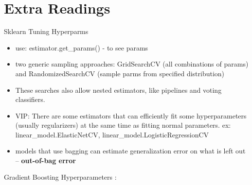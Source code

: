 \documentclass[a4paper]{report}
\newcommand{\brown}{\color{brown}}
\begin{document}
\section{Extra Readings}
Sklearn Tuning Hyperparms
\begin{itemize}
  \item use: {\brown estimator.get\_params()} - to see params
  \item two generic sampling approaches: GridSearchCV (all combinations of params) and RandomizedSearchCV (sample parms from specified distribution)
  \item These searches also allow nested estimators, like pipelines and voting classifiers.
  \item VIP: There are some estimators that can efficiently fit some hyperparameters (usually regularizers) at the same time as fitting normal parameters.
    \subitem ex: linear\_model.ElasticNetCV, linear\_model.LogisticRegressionCV
  \item models that use bagging can estimate generalization error on what is left out -- {\bf out-of-bag error}
\end{itemize}
Gradient Boosting Hyperparameters :
\end{document}
